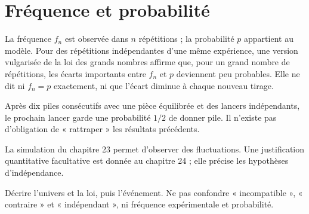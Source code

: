 \documentclass[../cours_2de.tex]{subfiles}
\begin{document}
\section{Fréquence et probabilité}
La fréquence $f_n$ est observée dans $n$ répétitions ; la probabilité $p$ appartient au modèle.
Pour des répétitions indépendantes d'une même expérience, une version vulgarisée de la loi des grands nombres affirme que, pour un grand nombre de répétitions, les écarts importants entre $f_n$ et $p$ deviennent peu probables.
Elle ne dit ni $f_n=p$ exactement, ni que l'écart diminue à chaque nouveau tirage.
\begin{exemple}
Après dix piles consécutifs avec une pièce équilibrée et des lancers indépendants, le prochain lancer garde une probabilité $1/2$ de donner pile. Il n'existe pas d'obligation de « rattraper » les résultats précédents.
\end{exemple}
La simulation du chapitre 23 permet d'observer des fluctuations. Une justification quantitative facultative est donnée au chapitre 24 ; elle précise les hypothèses d'indépendance.
\begin{retenir}
Décrire l'univers et la loi, puis l'événement. Ne pas confondre « incompatible », « contraire » et « indépendant », ni fréquence expérimentale et probabilité.
\end{retenir}
\end{document}
